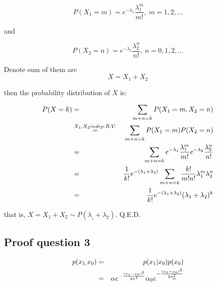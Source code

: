 \documentclass[english,11pt]{article}
\begin{document}
\begin{equation}
P(X_{1}=m)=e^{-\lambda_{1}}\frac{\lambda_{1}^{m}}{m!},\ m=1,2,...    
\end{equation}


and

\begin{equation}
P(X_{2}=n)=e^{-\lambda_{2}}\frac{\lambda_{2}^{n}}{n!},\ n=0,1,2,...    
\end{equation}


Denote sum of them are 
\begin{equation}
X=X_{1}+X_{2}
\end{equation}

then the probability distribution of $X$ is:

\begin{eqnarray}
P(X=k) & = & \sum_{m+n=k}P(X_{1}=m,X_{2}=n) \notag \\
 & \overset{X_{1},X_{2}indep.R.V.}{=} & \sum_{m+n=k}P(X_{1}=m)P(X_{2}=n) \notag \\
 & = & \sum_{m+n=k}e^{-\lambda_{1}}\frac{\lambda_{1}^{m}}{m!}e^{-\lambda_{2}}\frac{\lambda_{2}^{n}}{n!} \notag \\
 & = & \frac{1}{k!}e^{-(\lambda_{1}+\lambda_{2})}\sum_{m+n=k}\frac{k!}{m!n!}\lambda_{1}^{m}\lambda_{2}^{n} \notag \\
 & = & \frac{1}{k!}e^{-(\lambda_{1}+\lambda_{2})}(\lambda_{1}+\lambda_{2})^{k}
\end{eqnarray}

that is, $X=X_{1}+X_{2}\sim P(\lambda_{_{1}}+\lambda_{2})$. Q.E.D.

\subsection{Proof question 3}

\begin{eqnarray}
p(x_{1,}x_{0}) & = & p(x_{1}|x_{0})p(x_{0}) \notag \\
 & = & \alpha e^{-\frac{(x_{1}-x_{0})^{2}}{2\sigma^{2}}}\alpha_{0}e^{-\frac{(x_{0}-\mu_{0})^{2}}{2\sigma_{0}^{2}}}
\end{eqnarray}
\end{document}
